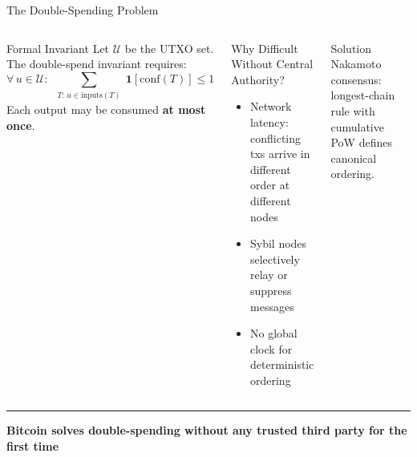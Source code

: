 \documentclass[8pt,aspectratio=169]{beamer}
\newcommand{\bottomnote}[1]{\vfill\vspace{-2mm}\textcolor{mllavender2}{\rule{\textwidth}{0.4pt}}\vspace{1mm}\footnotesize\textbf{#1}}
\begin{document}
\begin{frame}{The Double-Spending Problem}
\begin{columns}
\begin{block}{Formal Invariant}
Let $\mathcal{U}$ be the UTXO set. The double-spend invariant requires:
\[\forall\, u \in \mathcal{U}:\;\sum_{\substack{T:\,u\in\mathrm{inputs}(T)}} \mathbf{1}[\mathrm{conf}(T)] \leq 1\]
Each output may be consumed \textbf{at most once}.
\end{block}
\vspace{2mm}
\begin{block}{Why Difficult Without Central Authority?}
\begin{itemize}\small
  \item Network latency: conflicting txs arrive in different order at different nodes
  \item Sybil nodes selectively relay or suppress messages
  \item No global clock for deterministic ordering
\end{itemize}
\end{block}
\begin{alertblock}{Solution}
\small Nakamoto consensus: longest-chain rule with cumulative PoW defines canonical ordering.
\end{alertblock}
\end{columns}
\bottomnote{Bitcoin solves double-spending without any trusted third party for the first time}
\end{frame}
\end{document}
